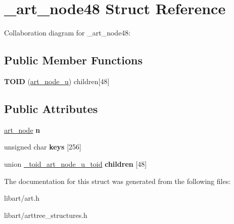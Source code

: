 \hypertarget{struct__art__node48}{}\section{\+\_\+art\+\_\+node48 Struct Reference}
\label{struct__art__node48}


Collaboration diagram for \+\_\+art\+\_\+node48\+:
\subsection*{Public Member Functions}
\begin{DoxyCompactItemize}
\item 
\mbox{\label{struct__art__node48_af13c73d4484e7cc3c0c27cd35ab5e76b}} 
{\bfseries T\+O\+ID} (\hyperlink{struct__art__node__u}{art\+\_\+node\+\_\+u}) children\mbox{[}48\mbox{]}
\end{DoxyCompactItemize}
\subsection*{Public Attributes}
\begin{DoxyCompactItemize}
\item 
\mbox{\label{struct__art__node48_aec3337c7cb130d838bddef718e6927fd}} 
\hyperlink{struct__art__node}{art\+\_\+node} {\bfseries n}
\item 
\mbox{\label{struct__art__node48_a254fad0f2d7d7a085322fb699b220ce3}} 
unsigned char {\bfseries keys} \mbox{[}256\mbox{]}
\item 
\mbox{\label{struct__art__node48_a4490f2fe3bbc7b2403e452d14042e8b2}} 
union \hyperlink{union__toid__art__node__u__toid}{\+\_\+toid\+\_\+art\+\_\+node\+\_\+u\+\_\+toid} {\bfseries children} \mbox{[}48\mbox{]}
\end{DoxyCompactItemize}


The documentation for this struct was generated from the following files\+:\begin{DoxyCompactItemize}
\item 
libart/art.\+h\item 
libart/arttree\+\_\+structures.\+h\end{DoxyCompactItemize}
